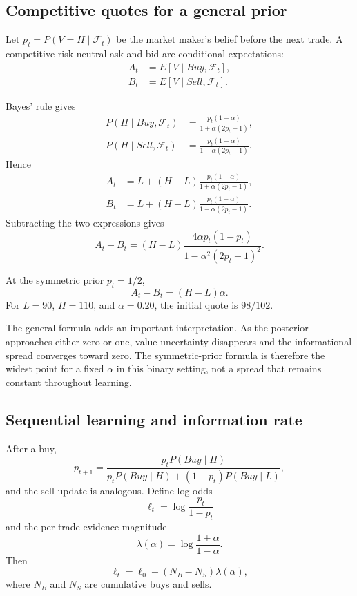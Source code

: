 \documentclass[11pt]{article}
\begin{document}
\subsection{Competitive quotes for a general prior}

Let $p_t=P(V=H\mid\mathcal{F}_t)$ be the market maker's belief before the next trade. A competitive risk-neutral ask and bid are conditional expectations:
\begin{align}
A_t&=E[V\mid Buy,\mathcal{F}_t],\\
B_t&=E[V\mid Sell,\mathcal{F}_t].
\end{align}

Bayes' rule gives
\begin{align}
P(H\mid Buy,\mathcal{F}_t)
&=\frac{p_t(1+\alpha)}{1+\alpha(2p_t-1)},\\
P(H\mid Sell,\mathcal{F}_t)
&=\frac{p_t(1-\alpha)}{1-\alpha(2p_t-1)}.
\end{align}
Hence
\begin{align}
A_t
&=L+(H-L)\frac{p_t(1+\alpha)}{1+\alpha(2p_t-1)},\\
B_t
&=L+(H-L)\frac{p_t(1-\alpha)}{1-\alpha(2p_t-1)}.
\end{align}
Subtracting the two expressions gives
\begin{equation}
\boxed{
A_t-B_t
=(H-L)\frac{4\alpha p_t(1-p_t)}{1-\alpha^2(2p_t-1)^2}
}.
\end{equation}

At the symmetric prior $p_t=1/2$,
\begin{equation}
\boxed{A_t-B_t=(H-L)\alpha.}
\end{equation}
For $L=90$, $H=110$, and $\alpha=0.20$, the initial quote is $98/102$.

The general formula adds an important interpretation. As the posterior approaches either zero or one, value uncertainty disappears and the informational spread converges toward zero. The symmetric-prior formula is therefore the widest point for a fixed $\alpha$ in this binary setting, not a spread that remains constant throughout learning.

\subsection{Sequential learning and information rate}

After a buy,
\begin{equation}
p_{t+1}
=\frac{p_tP(Buy\mid H)}{p_tP(Buy\mid H)+(1-p_t)P(Buy\mid L)},
\end{equation}
and the sell update is analogous. Define log odds
\begin{equation}
\ell_t=\log\frac{p_t}{1-p_t}
\end{equation}
and the per-trade evidence magnitude
\begin{equation}
\lambda(\alpha)=\log\frac{1+\alpha}{1-\alpha}.
\end{equation}
Then
\begin{equation}
\ell_t
=\ell_0+(N_B-N_S)\lambda(\alpha),
\end{equation}
where $N_B$ and $N_S$ are cumulative buys and sells.
\end{document}
